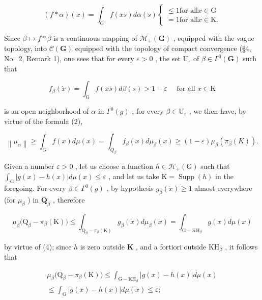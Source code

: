\[
(f * \alpha) (x) = \int_ {\mathrm{G}} f (x s)   d \alpha (s) \left\{ \begin{array}{l} \leqslant 1 \text {for all} x \in \mathrm{G} \\ = 1 \text {for all} x \in \mathrm{K}. \end{array} \right.
\]

Since \(\beta \mapsto f * \beta\) is a continuous mapping of \(\mathcal{M}_{+}(\mathbf{G})\) , equipped with the vague topology, into \(\mathcal{C}(\mathbf{G})\) equipped with the topology of compact convergence (§4, No.~2, Remark 1), one sees that for every \(\varepsilon > 0\) , the set \(\mathrm{U}_{\varepsilon}\) of \(\beta \in \Gamma^0 (\mathbf{G})\) such that

\[
f _ {\beta} (\dot {x}) = \int_ {\mathrm{G}} f (x s) d \beta (s) > 1 - \varepsilon \quad \text { for   all } x \in \mathrm{K}
\]

is an open neighborhood of \(\alpha\) in \(\Gamma^0 (g)\) ; for every \(\beta \in \mathrm{U}_{\varepsilon}\) , we then have, by virtue of the formula (2),

\[
\left\| \mu_ {\alpha} \right\| \geqslant \int_ {G} f (x) d \mu (x) = \int_ {Q _ {\beta}} f _ {\beta} (\dot {x}) d \mu_ {\beta} (\dot {x}) \geqslant (1 - \varepsilon) \mu_ {\beta} \left(\pi_ {\beta} (K)\right).\tag{5}
\]

Given a number \(\varepsilon > 0\) , let us choose a function \(h \in \mathcal{H}_{+}(\mathrm{G})\) such that \(\int_{\mathrm{G}} |g(x) - h(x)| d\mu(x) \leqslant \varepsilon\) , and let us take \(\mathrm{K} = \operatorname{Supp}(h)\) in the foregoing. For every \(\beta \in \Gamma^0(g)\) , by hypothesis \(g_\beta(\dot{x}) \geqslant 1\) almost everywhere (for \(\mu_\beta\) ) in \(\mathbf{Q}_\beta\) , therefore

\[
\mu_ {\beta} \big (\mathrm{Q} _ {\beta} - \pi_ {\beta} (\mathrm{K}) \big) \leqslant \int_ {\mathrm{Q} _ {\beta} - \pi_ {\beta} (\mathrm{K})} g _ {\beta} (\dot {x}) d \mu_ {\beta} (\dot {x}) = \int_ {\mathrm{G} - \mathrm{KH} _ {\beta}} g (x) d \mu (x)
\]

by virtue of (4); since \(h\) is zero outside \(\mathbf{K}\) , and a fortiori outside \(\mathrm{KH}_{\beta}\) , it follows that

\[
\begin{array}{c} \mu_ {\beta} \big (\mathrm{Q} _ {\beta} - \pi_ {\beta} (\mathrm{K}) \big) \leqslant \int_ {\mathrm{G} - \mathrm{KH} _ {\beta}} | g (x) - h (x) | d \mu (x) \\ \leqslant \int_ {\mathrm{G}} | g (x) - h (x) | d \mu (x) \leqslant \varepsilon ; \end{array}
\]


